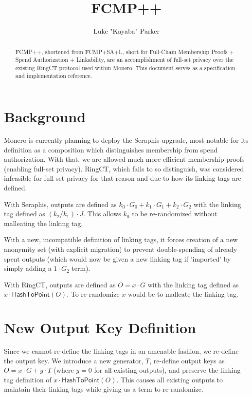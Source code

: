 \documentclass[]{article}
\title{FCMP++}
\author{Luke "Kayaba" Parker}
\begin{document}
\maketitle

\begin{abstract}
	
	FCMP++, shortened from FCMP+SA+L, short for Full-Chain Membership Proofs + Spend Authorization + Linkability, are an accomplishment of full-set privacy over the existing RingCT protocol used within Monero. This document serves as a specification and implementation reference.

\end{abstract}

\section{Background}

\newcommand{\hashtopoint}{\mathsf{HashToPoint}}

Monero is currently planning to deploy the Seraphis upgrade, most notable for its definition as a composition which distinguishes membership from spend authorization. With that, we are allowed much more efficient membership proofs (enabling full-set privacy). RingCT, which fails to so distinguish, was considered infeasible for full-set privacy for that reason and due to how its linking tags are defined.

With Seraphis, outputs are defined as $k_0 \cdot G_0 + k_1 \cdot G_1 + k_2 \cdot G_2$ with the linking tag defined as $(k_2 / k_1) \cdot J$. This allows $k_0$ to be re-randomized without malleating the linking tag.

With a new, incompatible definition of linking tags, it forces creation of a new anonymity set (with explicit migration) to prevent double-spending of already spent outputs (which would now be given a new linking tag if 'imported' by simply adding a $1 \cdot G_2$ term).

With RingCT, outputs are defined as $O = x \cdot G$ with the linking tag defined as $x \cdot \hashtopoint(O)$. To re-randomize $x$ would be to malleate the linking tag.

\section{New Output Key Definition}

Since we cannot re-define the linking tags in an amenable fashion, we re-define the output key. We introduce a new generator, $T$, re-define output keys as $O = x \cdot G + y \cdot T$ (where $y = 0$ for all existing outputs), and preserve the linking tag definition of $x \cdot \hashtopoint(O)$. This causes all existing outputs to maintain their linking tags while giving us a term to re-randomize.
\end{document}
